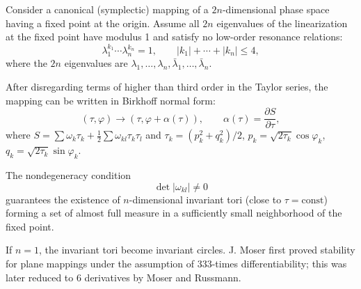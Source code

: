 Consider a canonical (symplectic) mapping of a $2n$-dimensional phase space having a fixed point at the origin. Assume all $2n$ eigenvalues of the linearization at the fixed point have modulus 1 and satisfy no low-order resonance relations:
$$\lambda_1^{k_1} \cdots \lambda_n^{k_n} = 1, \qquad |k_1| + \cdots + |k_n| \leq 4,$$
where the $2n$ eigenvalues are $\lambda_1, \ldots, \lambda_n, \bar{\lambda}_1, \ldots, \bar{\lambda}_n$.

After disregarding terms of higher than third order in the Taylor series, the mapping can be written in Birkhoff normal form:
$$(\tau, \varphi) \to (\tau, \varphi + \alpha(\tau)), \qquad \alpha(\tau) = \frac{\partial S}{\partial \tau},$$
where $S = \sum \omega_k \tau_k + \frac{1}{2} \sum \omega_{kl} \tau_k \tau_l$ and $\tau_k = (p_k^2 + q_k^2)/2$, $p_k = \sqrt{2\tau_k} \cos \varphi_k$, $q_k = \sqrt{2\tau_k} \sin \varphi_k$.

The nondegeneracy condition
$$\det |\omega_{kl}| \neq 0$$
guarantees the existence of $n$-dimensional invariant tori (close to $\tau = \text{const}$) forming a set of almost full measure in a sufficiently small neighborhood of the fixed point.

If $n = 1$, the invariant tori become invariant circles. J. Moser first proved stability for plane mappings under the assumption of 333-times differentiability; this was later reduced to 6 derivatives by Moser and Russmann.
